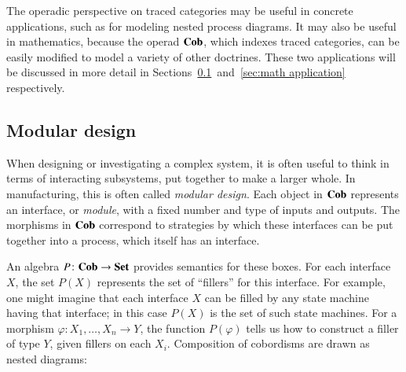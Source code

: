 \documentclass[12pt,oneside,article,draft]{memoir}
\begin{document}
The operadic perspective on traced categories may be useful in concrete applications, such as for modeling nested process diagrams.
It may also be useful in mathematics, because the operad $\mathbf{Cob}$, which indexes traced categories, can be easily modified to model a variety of other doctrines.
These two applications will be discussed in more detail in Sections~\ref{sec:modular}~and~\ref{sec:math application} respectively.

\subsection{Modular design}\label{sec:modular}

When designing or investigating a complex system, it is often useful to think in terms of interacting subsystems, put together to make a larger whole.
In manufacturing, this is often called \emph{modular design}.
Each object in $\mathbf{Cob}$ represents an interface, or \emph{module}, with a fixed number and type of inputs and outputs.
The morphisms in $\mathbf{Cob}$ correspond to strategies by which these interfaces can be put together into a process, which itself has an interface. 

An algebra $P\colon\mathbf{Cob}\to\mathbf{Set}$ provides semantics for these boxes.
For each interface $X$, the set $P(X)$ represents the set of ``fillers'' for this interface.
For example, one might imagine that each interface $X$ can be filled by any state machine having that interface; in this case $P(X)$ is the set of such state machines.
For a morphism $\varphi\colon X_1,\ldots,X_n\to Y$, the function $P(\varphi)$ tells us how to construct a filler of type $Y$, given fillers on each $X_i$.
Composition of cobordisms are drawn as nested diagrams:
\end{document}
